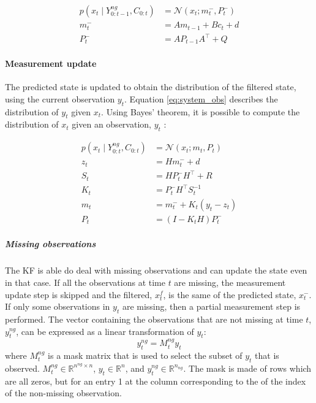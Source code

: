 \documentclass{article}
\newcommand{\norm}[3]{\mathcal{N}\left(#1; #2, #3\right)} %
\begin{document}
\begin{equation}
\begin{aligned}\label{eq:time_update}
    p(x_t \mid Y^{ng}_{0:t-1}, C_{0:t}) &= \norm{x_t}{m_t^-}{ P_t^-}\\
    m_t^- &= Am_{t-1} + B c_t + d \\
    P_t^- &= AP_{t-1}A^\top + Q
\end{aligned}
\end{equation}

\paragraph{Measurement update}

The predicted state is updated to obtain the distribution of the filtered state, using the current observation $y_t$. Equation \ref{eq:system_obs} describes the distribution of $y_t$ given $x_t$. Using Bayes' theorem, it is possible to compute the distribution of $x_t$ given an observation, $y_t$ \cite{bishop_pattern_2006, 2020_hennig_pml}:

\begin{equation}
\begin{aligned}
     p(x_t \mid Y^{ng}_{0:t}, C_{0:t}) &= \mathcal{N}(x_t; m_t, P_t) \label{eq:meas_update}\\
     z_t &= Hm_t^- + d \\
     S_t &= HP_t^-H^\top + R \\
     K_t &= P_t^-H^\top S_t^{-1} \\
     m_t &= m_t^- + K_t(y_t - z_t) \\
     P_t &= (I-K_tH)P_t^- 
\end{aligned}
\end{equation}
    
\subparagraph{Missing observations}

The KF is able do deal with missing observations and can update the state even in that case. 
If all the observations at time $t$ are missing, the measurement update step is skipped and the filtered, $x^f_t$, is the same of the predicted state, $x_t^-$. If only some observations in $y_t$ are missing, then a partial measurement step is performed.
The vector containing the observations that are not missing at time $t$, $y^{ng}_t$, can be expressed as a linear transformation of $y_t$:
\begin{equation}\label{eq:miss_obs}
    y^{ng}_t = M^{ng}_ty_t
\end{equation}
where $M^{ng}_t$ is a mask matrix that is used to select the subset of $y_t$ that is observed. $M_t^{ng} \in \mathbb{R}^{n^{ng} \times n}$, $y_t \in \mathbb{R}^n$, and $y_t^{ng} \in \mathbb{R}^{n_{ng}}$. The mask is made of rows which are all zeros, but for an entry 1 at the column corresponding to the of the index of the non-missing observation.
\end{document}
